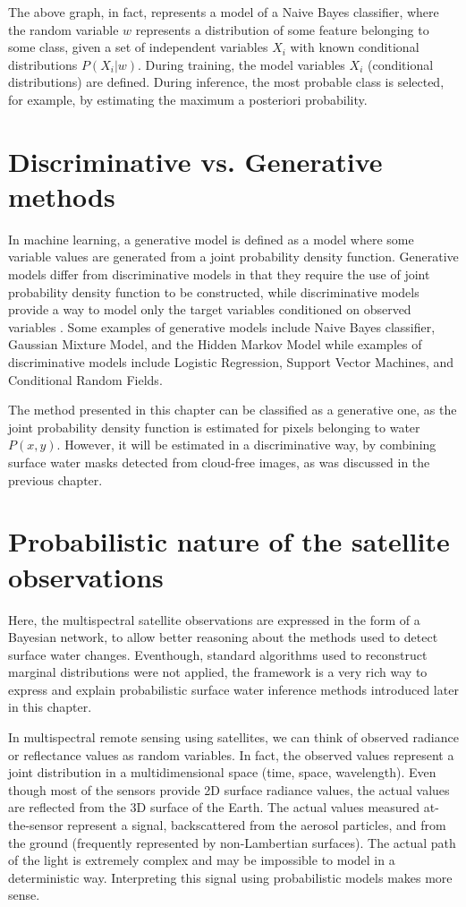 The above graph, in fact, represents a model of a Naive Bayes classifier, where the random variable $w$ represents a distribution of some feature belonging to some class, given a set of independent variables $X_i$ with known conditional distributions $P{(X_i|w)}$. During training, the model variables $X_i$ (conditional distributions) are defined. During inference, the most probable class is selected, for example, by estimating the maximum a posteriori probability.

\section{Discriminative vs. Generative methods}

In machine learning, a generative model is defined as a model where some variable values are generated from a joint probability density function. Generative models differ from discriminative models in that they require the use of joint probability density function to be constructed, while discriminative models provide a way to model only the target variables conditioned on observed variables \citet{ng2002discriminative}. Some examples of generative models include Naive Bayes classifier, Gaussian Mixture Model, and the Hidden Markov Model while examples of discriminative models include Logistic Regression, Support Vector Machines, and Conditional Random Fields. 

The method presented in this chapter can be classified as a generative one, as the joint probability density function is estimated for pixels belonging to water $P(x, y)$. However, it will be estimated in a discriminative way, by combining surface water masks detected from cloud-free images, as was discussed in the previous chapter.

\section{Probabilistic nature of the satellite observations}

Here, the multispectral satellite observations are expressed in the form of a Bayesian network, to allow better reasoning about the methods used to detect surface water changes. Eventhough, standard algorithms used to reconstruct marginal distributions were not applied, the framework is a very rich way to express and explain probabilistic surface water inference methods introduced later in this chapter.

In multispectral remote sensing using satellites, we can think of observed radiance or reflectance values as random variables. In fact, the observed values represent a joint distribution in a multidimensional space (time, space, wavelength). Even though most of the sensors provide 2D surface radiance values, the actual values are reflected from the 3D surface of the Earth. The actual values measured at-the-sensor represent a signal, backscattered from the aerosol particles, and from the ground (frequently represented by non-Lambertian surfaces). The actual path of the light is extremely complex and may be impossible to model in a deterministic way. Interpreting this signal using probabilistic models makes more sense.

